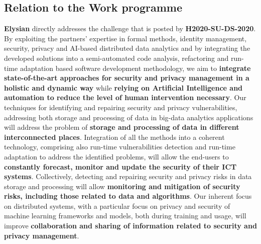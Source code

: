\documentclass[a4paper,11pt]{article}
\newcommand{\project}[1]{\textbf{#1}\xspace}
\newcommand{\SECURITY}{\project{Elysian}}
\newcommand{\TheProject}{\SECURITY}
\begin{document}
\subsection{Relation to the Work programme}
\TheProject{} directly addresses the challenge that is posted by \textbf{H2020-SU-DS-2020}. By exploiting the partners' expertise in formal methods, identity management, security, privacy and AI-based distributed data analytics and by integrating the developed solutions into a semi-automated code analysis, refactoring and run-time adaptation based software development methodology, we aim to \textbf{integrate state-of-the-art approaches for security and privacy management in a holistic and dynamic way} while \textbf{relying on Artificial Intelligence and automation to reduce the level of human intervention necessary}. Our techniques for identifying and repairing security and privacy vulnerabilities, addressing both storage and processing of data in big-data analytics applications will address the problem of \textbf{storage and processing of data in different interconnected places}. Integration of all the methods into a coherent technology, comprising also run-time vulnerabilities detection and run-time adaptation to address the identified problems, will allow the end-users to \textbf{constantly forecast, monitor and update the security of their ICT systems}. Collectively, detecting and repairing security and privacy risks in data storage and processing will allow \textbf{monitoring and mitigation of security risks, including those related to data and algorithms}. Our inherent focus on distributed systems, with a particular focus on privacy and security of machine learning frameworks and models, both during training and usage, will improve \textbf{collaboration and sharing of information related to security and privacy management}. 
\end{document}
